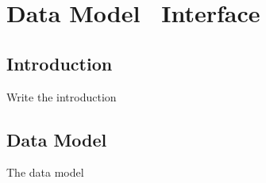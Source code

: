 \chapter{Data Model \amper\ Interface} %
\label{cha:data_model_interface}

\section{Introduction} %
\label{sec:introduction}
  Write the introduction

\section{Data Model} %
\label{sec:data_model}
The data model

